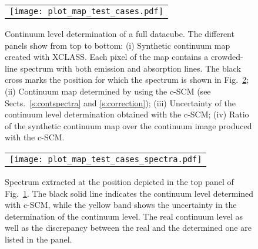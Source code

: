 \documentclass{aa}
\begin{document}
\begin{figure}[t]
\begin{center}
\begin{tabular}[b]{c}
        \texttt{[image: plot\_map\_test\_cases.pdf]} \\
\end{tabular}
\caption{Continuum level determination of a full datacube. The different panels show from top to bottom: (i) Synthetic continuum map created with XCLASS. Each pixel of the map contains a crowded-line spectrum with both emission and absorption lines. The black cross marks the position for which the spectrum is shown in Fig.~\ref{f:contexamplesspec}; (ii) Continuum map determined by using the c-SCM (see Sects.~\ref{s:contspectra} and \ref{s:correction}); (iii) Uncertainty of the continuum level determination obtained with the c-SCM; (iv) Ratio of the synthetic continuum map over the continuum image produced with the c-SCM.}
\label{f:contexamples}
\end{center}
\end{figure}

\begin{figure}[t]
\begin{center}
\begin{tabular}[b]{c}
        \texttt{[image: plot\_map\_test\_cases\_spectra.pdf]} \\
\end{tabular}
\caption{Spectrum extracted at the position depicted in the top panel of Fig.~\ref{f:contexamples}. The black solid line indicates the continuum level determined with c-SCM, while the yellow band shows the uncertainty in the determination of the continuum level. The real continuum level as well as the discrepancy between the real and the determined one are listed in the panel.}
\label{f:contexamplesspec}
\end{center}
\end{figure}
\end{document}
